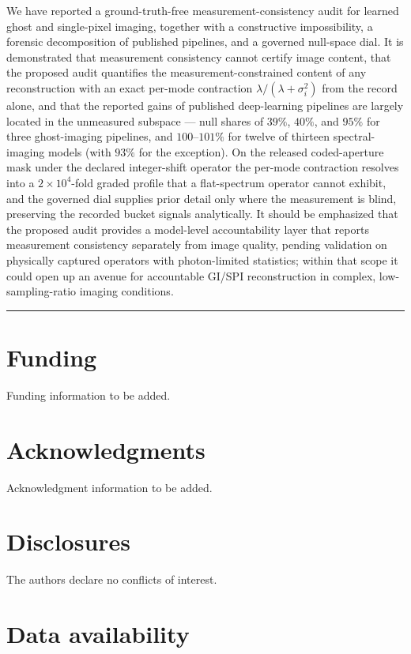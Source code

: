 \documentclass[11pt]{article}
\begin{document}
We have reported a ground-truth-free measurement-consistency audit for learned ghost and single-pixel imaging, together with a constructive impossibility, a forensic decomposition of published pipelines, and a governed null-space dial. It is demonstrated that measurement consistency cannot certify image content, that the proposed audit quantifies the measurement-constrained content of any reconstruction with an exact per-mode contraction $\lambda/(\lambda+\sigma_i^2)$ from the record alone, and that the reported gains of published deep-learning pipelines are largely located in the unmeasured subspace --- null shares of $39\%$, $40\%$, and $95\%$ for three ghost-imaging pipelines, and $100$--$101\%$ for twelve of thirteen spectral-imaging models (with $93\%$ for the exception). On the released coded-aperture mask under the declared integer-shift operator the per-mode contraction resolves into a $2\times10^4$-fold graded profile that a flat-spectrum operator cannot exhibit, and the governed dial supplies prior detail only where the measurement is blind, preserving the recorded bucket signals analytically. It should be emphasized that the proposed audit provides a model-level accountability layer that reports measurement consistency separately from image quality, pending validation on physically captured operators with photon-limited statistics; within that scope it could open up an avenue for accountable GI/SPI reconstruction in complex, low-sampling-ratio imaging conditions.

\medskip\hrule\medskip

\section*{Funding}

Funding information to be added.

\section*{Acknowledgments}

Acknowledgment information to be added.

\section*{Disclosures}

The authors declare no conflicts of interest.

\section*{Data availability}
\end{document}
